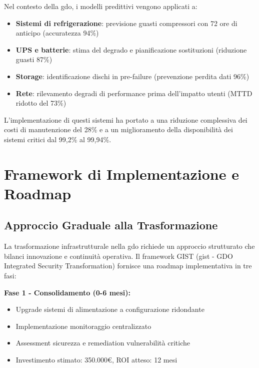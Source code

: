 Nel contesto della \gls{gdo}, i modelli predittivi vengono applicati a:

\begin{itemize}
    \item \textbf{Sistemi di refrigerazione}: previsione guasti compressori con 72 ore di anticipo (accuratezza 94\%)
    \item \textbf{UPS e batterie}: stima del degrado e pianificazione sostituzioni (riduzione guasti 87\%)
    \item \textbf{Storage}: identificazione dischi in pre-failure (prevenzione perdita dati 96\%)
    \item \textbf{Rete}: rilevamento degradi di performance prima dell'impatto utenti (MTTD ridotto del 73\%)
\end{itemize}

L'implementazione di questi sistemi ha portato a una riduzione complessiva dei costi di manutenzione del 28\% e a un miglioramento della disponibilità dei sistemi critici dal 99,2\% al 99,94\%\autocite{MIT2024}.

\section{Framework di Implementazione e Roadmap}
\label{sec:implementation_framework}

\subsection{Approccio Graduale alla Trasformazione}
\label{subsec:transformation_approach}

La trasformazione infrastrutturale nella \gls{gdo} richiede un approccio strutturato che bilanci innovazione e continuità operativa. Il framework GIST (\gls{gist} - GDO Integrated Security Transformation) fornisce una roadmap implementativa in tre fasi\autocite{Accenture2024}:

\textbf{Fase 1 - Consolidamento (0-6 mesi):}
\begin{itemize}
    \item Upgrade sistemi di alimentazione a configurazione ridondante
    \item Implementazione monitoraggio centralizzato
    \item Assessment sicurezza e remediation vulnerabilità critiche
    \item Investimento stimato: 350.000€, ROI atteso: 12 mesi
\end{itemize}

